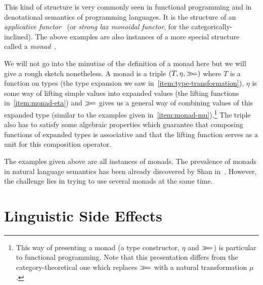 This kind of structure is very commonly seen in functional programming and
in denotational semantics of programming languages. It is the structure of
an \emph{applicative functor}~\cite{mcbride2008applicative} (or
\emph{strong lax monoidal functor}, for the categorically-inclined). The
above examples are also instances of a more special structure called a
\emph{monad}~\cite{moggi1991notions}.

We will not go into the minutiae of the definition of a monad here but we
will give a rough sketch nonetheless. A monad is a triple
$(T, \eta, \mathbin{\gg\!=})$ where $T$ is a function on types (the type expansion
we saw in~\ref{item:type-transformation}), $\eta$ is some way of lifting
simple values into expanded values (the lifting functions
in~\ref{item:monad-eta}) and $\mathbin{\gg\!=}$ gives us a general way of combining
values of this expanded type (similar to the examples given
in~\ref{item:monad-mu}).\footnote{This way of presenting a monad (a type
  constructor, $\eta$ and $\mathbin{\gg\!=}$) is particular to functional
  programming. Note that this presentation differs from the
  category-theoretical one which replaces $\mathbin{\gg\!=}$ with a natural
  transformation $\mu$ \cite{mac1978categories}.} The triple also has to
satisfy some algebraic properties which guarantee that composing functions
of expanded types is associative and that the lifting function serves as a
unit for this composition operator.

The examples given above are all instances of monads. The prevalence of
monads in natural language semantics has been already discovered by Shan
in~\cite{shan2002monads}. However, the challenge lies in trying to use
several monads at the same time.


\section*{Linguistic Side Effects}

